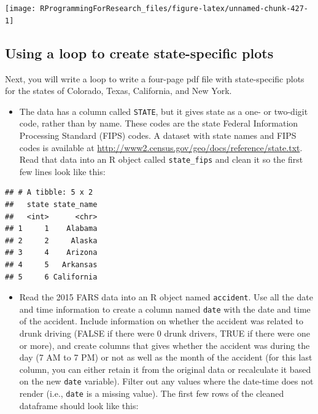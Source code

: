 \documentclass[]{book}
\providecommand{\tightlist}{%
  \setlength{\itemsep}{0pt}\setlength{\parskip}{0pt}}
\theoremstyle{definition}
\theoremstyle{definition}
\theoremstyle{definition}
\theoremstyle{remark}
\begin{document}
\begin{center}\texttt{[image: RProgrammingForResearch\_files/figure-latex/unnamed-chunk-427-1]} \end{center}

\subsection{Using a loop to create state-specific
plots}\label{using-a-loop-to-create-state-specific-plots}

Next, you will write a loop to write a four-page pdf file with
state-specific plots for the states of Colorado, Texas, California, and
New York.

\begin{itemize}
\tightlist
\item
  The data has a column called \texttt{STATE}, but it gives state as a
  one- or two-digit code, rather than by name. These codes are the state
  Federal Information Processing Standard (FIPS) codes. A dataset with
  state names and FIPS codes is available at
  \url{http://www2.census.gov/geo/docs/reference/state.txt}. Read that
  data into an R object called \texttt{state\_fips} and clean it so the
  first few lines look like this:
\end{itemize}

\begin{verbatim}
## # A tibble: 5 x 2
##   state state_name
##   <int>      <chr>
## 1     1    Alabama
## 2     2     Alaska
## 3     4    Arizona
## 4     5   Arkansas
## 5     6 California
\end{verbatim}

\begin{itemize}
\tightlist
\item
  Read the 2015 FARS data into an R object named \texttt{accident}. Use
  all the date and time information to create a column named
  \texttt{date} with the date and time of the accident. Include
  information on whether the accident was related to drunk driving
  (FALSE if there were 0 drunk drivers, TRUE if there were one or more),
  and create columns that gives whether the accident was during the day
  (7 AM to 7 PM) or not as well as the month of the accident (for this
  last column, you can either retain it from the original data or
  recalculate it based on the new \texttt{date} variable). Filter out
  any values where the date-time does not render (i.e., \texttt{date} is
  a missing value). The first few rows of the cleaned dataframe should
  look like this:
\end{itemize}
\end{document}
